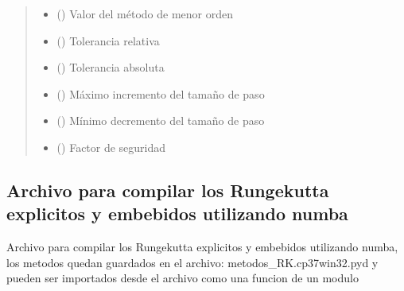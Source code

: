 \documentclass[letterpaper,10pt,spanish]{sphinxmanual}
\begin{document}
\begin{fulllineitems}
\begin{quote}
\begin{description}
\begin{itemize}
\item {} 
 () \textendash{} Valor del método de menor orden

\item {} 
 () \textendash{} Tolerancia relativa

\item {} 
 () \textendash{} Tolerancia absoluta

\item {} 
 () \textendash{} Máximo incremento del tamaño de paso

\item {} 
 () \textendash{} Mínimo decremento del tamaño de paso

\item {} 
 () \textendash{} Factor de seguridad

\end{itemize}

\end{description}\end{quote}

\end{fulllineitems}



\subsection{Archivo para compilar los Runge\sphinxhyphen{}kutta explicitos y embebidos utilizando numba}
\label{\detokenize{codigos/rk_generator:archivo-para-compilar-los-runge-kutta-explicitos-y-embebidos-utilizando-numba}}\label{\detokenize{codigos/rk_generator::doc}}\label{\detokenize{codigos/rk_generator:module-rk_generator}}
Archivo para compilar los Runge\sphinxhyphen{}kutta explicitos y embebidos utilizando numba, los metodos quedan guardados en el archivo: metodos\_RK.cp37\sphinxhyphen{}win32.pyd y pueden ser importados desde el archivo como una funcion de un modulo
\end{document}

